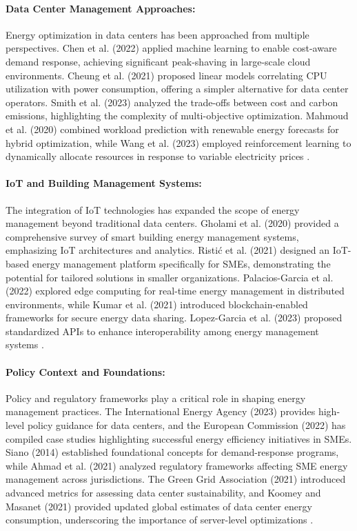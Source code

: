 \paragraph{\textbf{Data Center Management Approaches:}}
Energy optimization in data centers has been approached from multiple perspectives. Chen et al. (2022) applied machine learning to enable cost-aware demand response, achieving significant peak-shaving in large-scale cloud environments. Cheung et al. (2021) proposed linear models correlating CPU utilization with power consumption, offering a simpler alternative for data center operators. Smith et al. (2023) analyzed the trade-offs between cost and carbon emissions, highlighting the complexity of multi-objective optimization. Mahmoud et al. (2020) combined workload prediction with renewable energy forecasts for hybrid optimization, while Wang et al. (2023) employed reinforcement learning to dynamically allocate resources in response to variable electricity prices \cite{chen2022datacentermodel,cheung2021utilizationmodel,smith2023warofefficiencies,mahmoud2020cost,wang2023reinforcement}.
\paragraph{\textbf{IoT and Building Management Systems:}}
The integration of IoT technologies has expanded the scope of energy management beyond traditional data centers. Gholami et al. (2020) provided a comprehensive survey of smart building energy management systems, emphasizing IoT architectures and analytics. Ristić et al. (2021) designed an IoT-based energy management platform specifically for SMEs, demonstrating the potential for tailored solutions in smaller organizations. Palacios-Garcia et al. (2022) explored edge computing for real-time energy management in distributed environments, while Kumar et al. (2021) introduced blockchain-enabled frameworks for secure energy data sharing. Lopez-Garcia et al. (2023) proposed standardized APIs to enhance interoperability among energy management systems \cite{gholami2020energymanagement,ristic2021iotenergymanagement,palacios2022edge,kumar2021blockchain,lopez2023standardized}.
\paragraph{\textbf{Policy Context and Foundations:}}
Policy and regulatory frameworks play a critical role in shaping energy management practices. The International Energy Agency (2023) provides high-level policy guidance for data centers, and the European Commission (2022) has compiled case studies highlighting successful energy efficiency initiatives in SMEs. Siano (2014) established foundational concepts for demand-response programs, while Ahmad et al. (2021) analyzed regulatory frameworks affecting SME energy management across jurisdictions. The Green Grid Association (2021) introduced advanced metrics for assessing data center sustainability, and Koomey and Masanet (2021) provided updated global estimates of data center energy consumption, underscoring the importance of server-level optimizations \cite{iea2023datacenters,ec2022energyefficiencysmes,siano2014demandresponse,ahmad2021regulatory,greengrid2021beyond,koomey2021does}.
